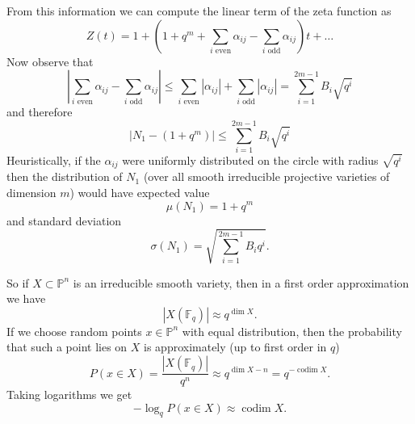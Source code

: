 \documentclass[12pt,a4paper]{amsart}
\theoremstyle{plain}
\theoremstyle{definition}
\newcommand{\FF}{\mathbb F}
\newcommand{\PP}{\mathbb P}
\DeclareMathOperator{\codim}{codim}
\begin{document}
From this information we can compute the linear term of the zeta function as
\[
	Z(t) = 1 + \left( 1 + q^m + \sum_{\text{$i$ even}} \alpha_{ij} - \sum_{\text{$i$ odd}} \alpha_{ij} \right) t + \dots
\]
Now observe that
\[
	\left| \sum_{\text{$i$ even}} \alpha_{ij} - \sum_{\text{$i$ odd}} \alpha_{ij} \right| 
	\le \sum_{\text{$i$ even}} |\alpha_{ij}| + \sum_{\text{$i$ odd}} |\alpha_{ij}|  
	= \sum_{i=1}^{2m-1} B_i \sqrt{q^i}
\]
and therefore
\[
	| N_1 - (1+q^m) | \le \sum_{i=1}^{2m-1} B_i \sqrt{q^i}
\]
Heuristically, if the $\alpha_{ij}$ were uniformly distributed on the circle with radius $\sqrt{q^i}$ then the distribution of $N_1$ (over all smooth irreducible projective varieties of dimension $m$) would have expected value
\[
	\mu(N_1) = 1+ q^m
\]
and standard deviation
\[
	\sigma(N_1) = \sqrt{\sum_{i=1}^{2m-1} B_i q^i}.
\]

So if $X \subset \PP^n$ is an irreducible smooth variety, then in a first order approximation we have
\[
	|X(\FF_q) | \approx q^{\dim X}.
\]
If we choose random points $x \in \PP^n$ with equal distribution, then the probability that such a point lies on $X$ is approximately (up to first order in $q$)
\[
	P(x \in X) = \frac{|X(\FF_q)|}{q^n} \approx q^{\dim X - n} = q^{-\codim X}.
\]
Taking logarithms we get
\[
	- \log_q P(x \in X) \approx \codim X.
\]

\end{document}
